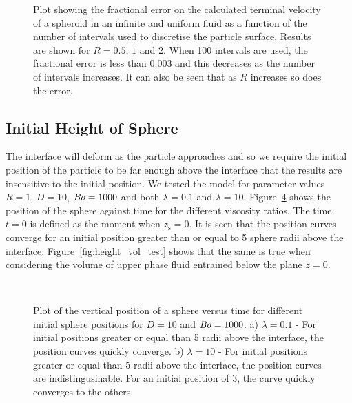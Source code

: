 \documentclass[12pt]{article}
\newcommand\Bo{\mbox{\textit{Bo}}}  %
\begin{document}
  \begin{figure}
    
    \caption{Plot showing the fractional error on the calculated terminal velocity of a spheroid in an infinite and uniform fluid as a function of the number of intervals used to discretise the particle surface. Results are shown for $R = 0.5$, $1$ and $2$. When 100 intervals are used, the fractional error is less than 0.003 and this decreases as the number of intervals increases. It can also be seen that as $R$ increases so does the error. \label{fig:int_vel_test}}
  \end{figure}

\subsection{Initial Height of Sphere}
\label{subsec:init_pos}

The interface will deform as the particle approaches and so we require the initial position of the particle to be far enough above the interface that the results are insensitive to the initial position. We tested the model for parameter values $R = 1$, $D = 10 $, $\Bo = 1000$ and both $\lambda = 0.1$ and $\lambda = 10$. Figure~\ref{fig:height_test_pos} shows the position of the sphere against time for the different viscosity ratios. The time $t = 0$ is defined as the moment when $z_{\text{s}} = 0$. It is seen that the position curves converge for an initial position greater than or equal to 5 sphere radii above the interface. Figure~\ref{fig:height_vol_test} shows that the same is true when considering the volume of upper phase fluid entrained below the plane $z = 0$.

    \begin{figure}
      \centering
      \begin{subfigure}[b]{0.5\textwidth}
        \resizebox{\textwidth}{!}{\Large }
        \caption{}
        \label{fig:height_test_pos_tail}
      \end{subfigure}%
      ~
      \begin{subfigure}[b]{0.5\textwidth}
        \resizebox{\textwidth}{!}{\Large }
        \caption{}
        \label{fig:height_test_pos_film}
      \end{subfigure}
      \caption{Plot of the vertical position of a sphere versus time for different initial sphere positions for $D = 10$ and $\Bo = 1000$. a) $\lambda = 0.1$ - For initial positions greater or equal than 5 radii above the interface, the position curves quickly converge. b) $\lambda = 10$ - For initial positions greater or equal than 5 radii above the interface, the position curves are indistingusihable. For an initial position of 3, the curve quickly converges to the others.}\label{fig:height_test_pos}
    \end{figure}
\end{document}

